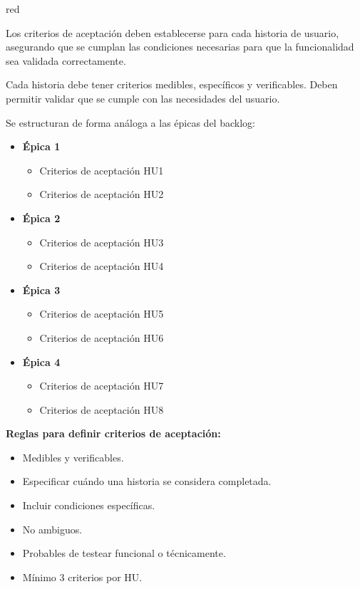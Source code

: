 \documentclass[
11pt, %
]{charter}
\begin{document}
\begin{consigna}{red} %

Los criterios de aceptación deben establecerse para cada historia de usuario, asegurando que se cumplan las condiciones necesarias para que la funcionalidad sea validada correctamente.

Cada historia debe tener criterios medibles, específicos y verificables. Deben permitir validar que se cumple con las necesidades del usuario.

Se estructuran de forma análoga a las \'{e}picas del backlog:

\begin{itemize}
  \item \textbf{\'{E}pica 1}
    \begin{itemize}
      \item Criterios de aceptación HU1
      \item Criterios de aceptación HU2
    \end{itemize}
  \item \textbf{\'{E}pica 2}
    \begin{itemize}
      \item Criterios de aceptación HU3
      \item Criterios de aceptación HU4
    \end{itemize}
  \item \textbf{\'{E}pica 3}
    \begin{itemize}
      \item Criterios de aceptación HU5
      \item Criterios de aceptación HU6
    \end{itemize}
  \item \textbf{\'{E}pica 4}
    \begin{itemize}
      \item Criterios de aceptación HU7
      \item Criterios de aceptación HU8
    \end{itemize}
\end{itemize}

\textbf{Reglas para definir criterios de aceptación:}
\begin{itemize}
  \item Medibles y verificables.
  \item Especificar cuándo una historia se considera completada.
  \item Incluir condiciones específicas.
  \item No ambiguos.
  \item Probables de testear funcional o técnicamente.
  \item Mínimo 3 criterios por HU.
\end{itemize}

\end{consigna} %
\end{document}
